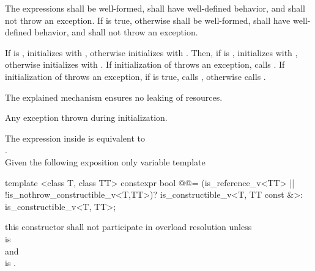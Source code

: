 \documentclass[ebook,11pt,article]{memoir}
\begin{document}
\begin{itemdescr}
\pnum
\requires
The expressions
 shall be well-formed, shall have well-defined behavior, and shall not throw an exception.
If  is true,  otherwise  shall be well-formed, shall have well-defined behavior, and shall not throw an exception.

\pnum
\effects 
If  is , initializes  with , otherwise initializes  with .
Then, if  is , initializes  with , otherwise initializes  with .
If initialization of  throws an exception, calls .  If initialization of  throws an exception, if  is true, calls , otherwise calls . 
\begin{note}
The explained mechanism ensures no leaking of resources.
\end{note}

\pnum
\throws Any exception thrown during initialization.

\pnum
\remarks
The expression inside  is equivalent to \\
 \tcode{\&\&} .\\
Given the following exposition only variable template
\begin{codeblock}
template <class T, class TT>
constexpr bool @@=
    (is_reference_v<TT> || !is_nothrow_constructible_v<T,TT>)?
    is_constructible_v<T, TT const &>:
    is_constructible_v<T, TT>;
\end{codeblock}
this constructor shall not participate in overload resolution unless
\\  is \\
and\\
 is .
\end{itemdescr}
\end{document}
